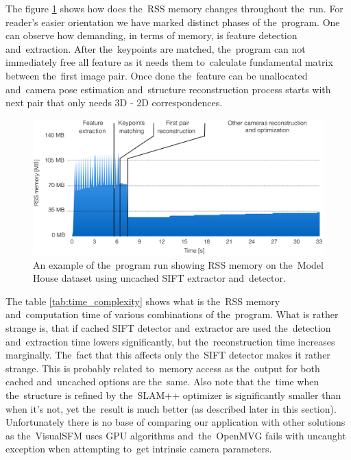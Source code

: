 The figure \ref{fig:rss_memory} shows how does the~RSS memory changes throughout the~run. For reader's easier orientation we have marked distinct phases of the~program. One can observe how demanding, in terms of memory, is feature detection and~extraction. After the~keypoints are matched, the~program can not immediately free all feature as it needs them to~calculate fundamental matrix between the~first image pair. Once done the~feature can be unallocated and~camera pose estimation and~structure reconstruction process starts with next pair that only needs 3D - 2D correspondences.

\begin{figure}[!htbp]
	\begin{center}
		\includegraphics[keepaspectratio,width=\textwidth]{fig/exp_model_house_memory.pdf}
	\end{center}
	\caption{An example of the~program run showing RSS memory on the~Model House dataset using uncached SIFT extractor and~detector.}
	\label{fig:rss_memory}
\end{figure} 

The table \ref{tab:time_complexity} shows what is the~RSS memory and~computation time of various combinations of the~program. What is rather strange is, that if cached SIFT detector and~extractor are used the~detection and~extraction time lowers significantly, but the~reconstruction time increases marginally. The~fact that this affects only the~SIFT detector makes it rather strange. This is probably related to~memory access as the~output for both cached and~uncached options are the~same. Also note that the~time when the~structure is refined by the~SLAM++ optimizer is significantly smaller than when it's not, yet the~result is much better (as described later in this section). Unfortunately there is no base of comparing our application with other solutions as the~VisualSFM uses GPU algorithms and~the~OpenMVG fails with uncaught exception when attempting to~get intrinsic camera parameters.

